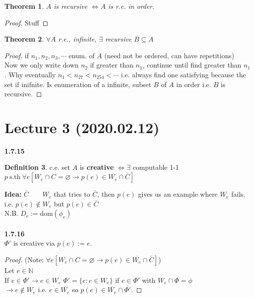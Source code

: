 \documentclass{article}
\let\ddd\cdots
\newcommand{\sth}{\ \mathrm{s.th}\ }
\newcommand{\N}{\mathbb{N}}
\newcommand{\dom}{\mathrm{dom}}
\renewcommand{\emptyset}{\varnothing}
\newtheorem{theorem}{Theorem}[section]
\theoremstyle{definition}
\newtheorem{definition}[theorem]{Definition}
\theoremstyle{remark}
\theoremstyle{example}
\begin{document}
	\begin{theorem}
		$A$ is recursive $\iff A$ is r.e. in order.
	\end{theorem}
	\begin{proof}
		Stuff
	\end{proof}

	\begin{theorem}
		$\forall A$ r.e., infinite, $\exists$ recursive $B \subseteq A$
	\end{theorem}
	\begin{proof}
		if $n_1,n_2,n_3,\ddd$ enum. of $A$ (need not be ordered, can have repetitions)\\
		Now we only write down $n_2$ if greater than $n_1$, continue until find greater than $n_1$.
		Why eventually $n_1 < n_{27} < n_{254} < \ddd$ i.e. always find one satisfying because the set if inifnite.
		Is enumeration of a infinite, subset $B$ of $A$ in order i.e. $B$ is recursive.
	\end{proof}

	\section*{Lecture 3 (2020.02.12)}
	\textbf{1.7.15}
	\begin{definition}
		c.e. set $A$ is \textbf{creative} $\iff \exists$ computable 1-1 $p \sth \forall e [W_e \cap C = \emptyset \to p(e) \in \overline{W_e} \cap \bar{C} ]$
	\end{definition}
	\textbf{Idea:} $\bar{C}\qquad W_e$ that tries to $\bar{C}$, then $p(e)$ gives us an example where $W_e$ fails.\\
	i.e. $p(e) \notin W_e$ but $p(e) \in \bar{C}$\\
	N.B. $D_e := \dom (\phi_e)$\\
	\\
	\textbf{1.7.16}\\
 	$\Phi'$ is creative via $p(e):=e$.
 	\begin{proof}
 		(Note: $\forall e [W_e \cap C = \emptyset \to p(e) \in \overline{W_e} \cap \bar{C} ]$)\\
 		Let $e \in \N$\\
 		If $e \in \Phi' \to e \in W_e$
 		$\Phi'=\{e: e \in W_e\}$
 		if $e \in \Phi'$ with $W_e \cap \Phi = \phi$\\
 		$\to e \notin W_e$ i.e. $e \in \overline{W_e}$ so $p(e) \in \overline{W_e} \cap \overline{\Phi'}$.
 	\end{proof}
 
\end{document}
